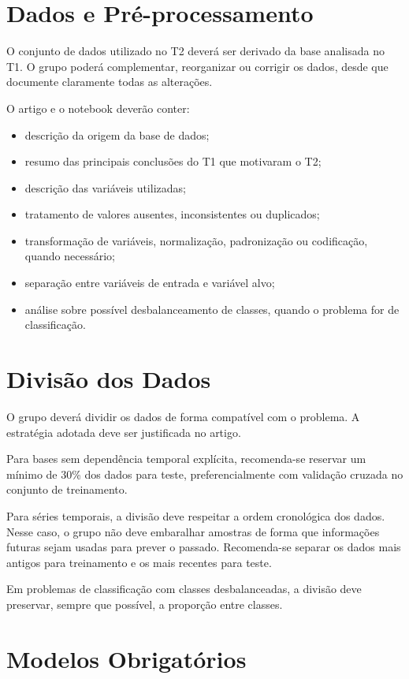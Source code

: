 \documentclass[a4paper]{ifacconf}
\begin{document}
\section{Dados e Pré-processamento}

O conjunto de dados utilizado no T2 deverá ser derivado da base analisada no T1. O grupo poderá complementar, reorganizar ou corrigir os dados, desde que documente claramente todas as alterações.

O artigo e o notebook deverão conter:
\begin{itemize}
    \item descrição da origem da base de dados;
    \item resumo das principais conclusões do T1 que motivaram o T2;
    \item descrição das variáveis utilizadas;
    \item tratamento de valores ausentes, inconsistentes ou duplicados;
    \item transformação de variáveis, normalização, padronização ou codificação, quando necessário;
    \item separação entre variáveis de entrada e variável alvo;
    \item análise sobre possível desbalanceamento de classes, quando o problema for de classificação.
\end{itemize}


\section{Divisão dos Dados}

O grupo deverá dividir os dados de forma compatível com o problema. A estratégia adotada deve ser justificada no artigo.

Para bases sem dependência temporal explícita, recomenda-se reservar um mínimo de 30\% dos dados para teste, preferencialmente com validação cruzada no conjunto de treinamento.

Para séries temporais, a divisão deve respeitar a ordem cronológica dos dados. Nesse caso, o grupo não deve embaralhar amostras de forma que informações futuras sejam usadas para prever o passado. Recomenda-se separar os dados mais antigos para treinamento e os mais recentes para teste.

Em problemas de classificação com classes desbalanceadas, a divisão deve preservar, sempre que possível, a proporção entre classes.

\section{Modelos Obrigatórios}
\end{document}

